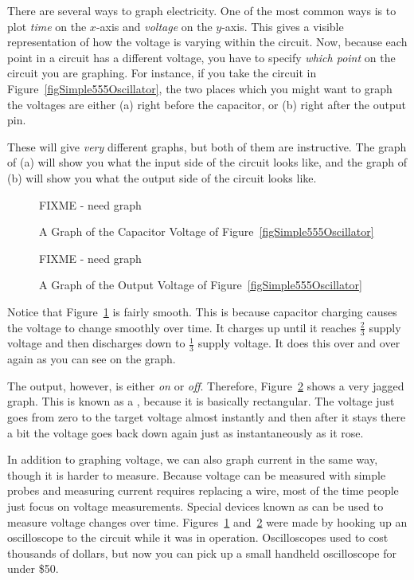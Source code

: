 There are several ways to graph electricity.
One of the most common ways is to plot \emph{time} on the $x$-axis and \emph{voltage} on the $y$-axis.  
This gives a visible representation of how the voltage is varying within the circuit.
Now, because each point in a circuit has a different voltage, you have to specify \emph{which point} on the circuit you are graphing.
For instance, if you take the circuit in Figure~\ref{figSimple555Oscillator}, the two places which you might want to graph the voltages are either (a) right before the capacitor, or (b) right after the output pin.

These will give \emph{very} different graphs, but both of them are instructive.  The graph of (a) will show you what the input side of the circuit looks like, and the graph of (b) will show you what the output side of the circuit looks like.

\begin{figure}
\caption{A Graph of the Capacitor Voltage of Figure~\ref{figSimple555Oscillator}}
\label{fig555CapacitorVoltage}
FIXME - need graph
\end{figure}

\begin{figure}
\caption{A Graph of the Output Voltage of Figure~\ref{figSimple555Oscillator}}
\label{fig555OutputVoltage}
FIXME - need graph
\end{figure}

Notice that Figure~\ref{fig555CapacitorVoltage} is fairly smooth.
This is because capacitor charging causes the voltage to change smoothly over time.
It charges up until it reaches $\frac{2}{3}$ supply voltage and then discharges down to $\frac{1}{3}$ supply voltage.
It does this over and over again as you can see on the graph.

The output, however, is either \emph{on} or \emph{off}.  
Therefore, Figure~\ref{fig555OutputVoltage} shows a very jagged graph.
This is known as a , because it is basically rectangular.
The voltage just goes from zero to the target voltage almost instantly and then after it stays there a bit the voltage goes back down again just as instantaneously as it rose.

In addition to graphing voltage, we can also graph current in the same way, though it is harder to measure.
Because voltage can be measured with simple probes and measuring current requires replacing a wire, most of the time people just focus on voltage measurements.
Special devices known as  can be used to measure voltage changes over time.
Figures~\ref{fig555CapacitorVoltage} and~\ref{fig555OutputVoltage} were made by hooking up an oscilloscope to the circuit while it was in operation.
Oscilloscopes used to cost thousands of dollars, but now you can pick up a small handheld oscilloscope for under \$50.

